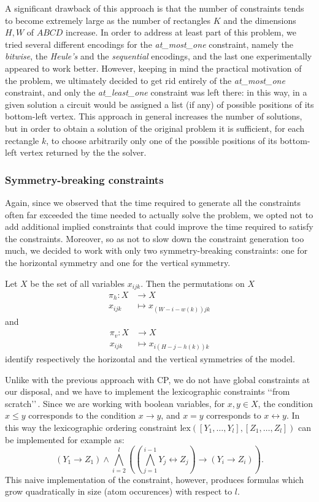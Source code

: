 \documentclass[]{article}
\begin{document}
A significant drawback of this approach is that the number of constraints tends to become extremely large as the number of rectangles $K$ and the dimensions $H, W$ of $ABCD$ increase. In order to address at least part of this problem, we tried several different encodings for the \emph{at\_most\_one} constraint, namely the \emph{bitwise}, the \emph{Heule's} and the \emph{sequential} encodings, and the last one experimentally appeared to work better. However, keeping in mind the practical motivation of the problem, we ultimately decided to get rid entirely of the \emph{at\_most\_one} constraint, and only the \emph{at\_least\_one} constraint was left there: in this way, in a given solution a circuit would be assigned a list (if any) of possible positions of its bottom-left vertex. This approach in general increases the number of solutions, but in order to obtain a solution of the original problem it is sufficient, for each rectangle $k$, to choose arbitrarily only one of the possible positions of its bottom-left vertex returned by the the solver.

\subsubsection{Symmetry-breaking constraints}
Again, since we observed that the time required to generate all the constraints often far exceeded the time needed to actually solve the problem, we opted not to add additional implied constraints that could improve the time required to satisfy the constraints. Moreover, so as not to slow down the constraint generation too much, we decided to work with only two symmetry-breaking constraints: one for the horizontal symmetry and one for the vertical symmetry. 

Let $X$ be the set of all variables $x_{ijk}$. Then the permutations on $X$ \begin{align*}
	\pi_h \colon X & \longrightarrow X \\
	x_{ijk} & \longmapsto x_{(W-i-w(k))jk}
\end{align*}
and \begin{align*}
	\pi_v \colon X & \longrightarrow X \\
	x_{ijk} & \longmapsto x_{i(H-j-h(k))k}
\end{align*}
identify respectively the horizontal and the vertical symmetries of the model. 

Unlike with the previous approach with CP, we do not have global constraints at our disposal, and we have to implement the lexicographic constraints \lq\lq from scratch\rq\rq\,. Since we are working with boolean variables, for $x,y\in X$, the condition $x\leq y$ corresponds to the condition $x\to y$, and $x=y$ corresponds to $x\leftrightarrow y$. In this way the lexicographic ordering constraint $\text{lex}([Y_1,\dots, Y_l],[Z_1,\dots,Z_l])$ can be implemented for example as: \begin{equation*}\left(Y_1\to Z_1\right) \wedge \bigwedge_{i=2}^l \left(\left(\bigwedge_{j=1}^{i-1} Y_j \leftrightarrow Z_j \right) \to \left(Y_i \to Z_i\right) \right).\end{equation*} This naive implementation of the constraint, however, produces formulas which grow quadratically in size (atom occurences) with respect to $l$. 
\end{document}
